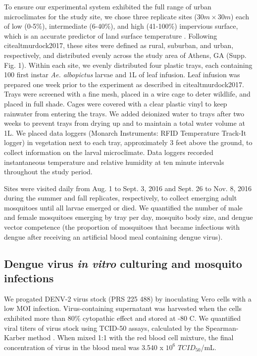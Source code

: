 \documentclass[12pt]{article}
\begin{document}
To ensure our experimental system exhibited the full range of urban microclimates for the study site, we chose three replicate sites ($30m \times 30m$) each of low (0-5\%), intermediate (6-40\%), and high (41-100\%) impervious surface, which is an accurate predictor of land surface temperature \citep{yuan2007}. Following citealt{murdock2017}, these sites were defined as rural, suburban, and urban, respectively, and distributed evenly across the study area of Athens, GA (Supp. Fig. 1). Within each site, we evenly distributed four plastic trays, each containing 100 first instar \textit{Ae. albopictus} larvae and 1L of leaf infusion. Leaf infusion was prepared one week prior to the experiment as described in citealt{murdock2017}.  Trays were screened with a fine mesh, placed in a wire cage to deter wildlife, and placed in full shade. Cages were covered with a clear plastic vinyl to keep rainwater from entering the trays. We added deionized water to trays after two weeks to prevent trays from drying up and to maintain a total water volume at 1L. We placed data loggers (Monarch Instruments: RFID Temperature Track-It logger) in vegetation next to each tray, approximately 3 feet above the ground, to collect information on the larval microclimate. Data loggers recorded instantaneous temperature and relative humidity at ten minute intervals throughout the study period.

Sites were visited daily from Aug. 1 to Sept. 3, 2016 and Sept. 26 to Nov. 8, 2016 during the summer and fall replicates, respectively, to collect emerging adult mosquitoes until all larvae emerged or died. We quantified the number of male and female mosquitoes emerging by tray per day, mosquito body size, and dengue vector competence (the proportion of mosquitoes that became infectious with dengue after receiving an artificial blood meal containing dengue virus).

\subsection{Dengue virus \textit{in vitro} culturing and mosquito infections}
We progated DENV-2 virus stock (PRS 225 488) by inoculating Vero cells with a low MOI infection. Virus-containing supernatant was harvested when the cells exhibited more than 80\% cytopathic effect and stored at -80 \degree C. We quantified viral titers of virus stock using TCID-50 assays, calculated by the Spearman-Karber method \citep{shao2016}. When mixed 1:1 with the red blood cell mixture, the final concentration of virus in the blood meal was 3.540 x $10^6$ $TCID_{50}$/mL.
\end{document}
